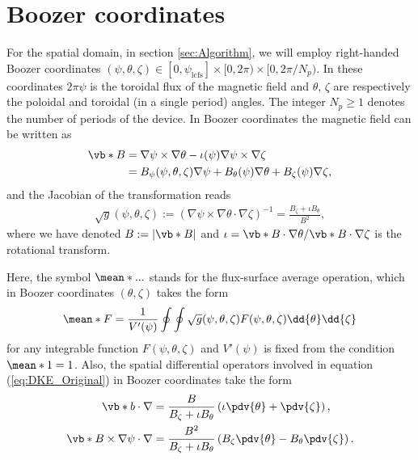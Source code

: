 \section{Boozer coordinates} \label{sec:Appendix_Boozer}
For the spatial domain, in section \ref{sec:Algorithm}, we will employ right-handed Boozer coordinates $(\psi,\theta,\zeta)\in[0,\psi_{\text{lcfs}}]\times[0,2\pi)\times[0,2\pi/N_p)$. In these coordinates $2\pi \psi$ is the toroidal flux of the magnetic field and $\theta$, $\zeta$ are respectively the poloidal and toroidal (in a single period) angles. The integer $N_p\ge 1$ denotes the number of periods of the device. In Boozer coordinates the magnetic field can be written as
\begin{align}
	\vb*{B} & = \nabla\psi \times \nabla\theta - \iota(\psi) \nabla\psi \times \nabla\zeta 
	\nonumber\\
	& = B_\psi(\psi,\theta,\zeta) \nabla \psi + B_\theta(\psi) \nabla \theta + B_\zeta(\psi) \nabla \zeta,
\end{align}
and the Jacobian of the transformation reads 
%
\begin{align}
	\sqrt{g}(\psi,\theta,\zeta) 
	:=( 
	\nabla\psi \times \nabla \theta \cdot \nabla\zeta  
	)^{-1} 
	= 
	\frac{B_\zeta + \iota B_\theta}{B^2},
\end{align}
where we have denoted $B:=|\vb*{B}|$ and $\iota =\vb*{B} \cdot \nabla \theta / \vb*{B} \cdot \nabla \zeta $ is the rotational transform.


Here, the symbol $\mean*{...}$ stands for the flux-surface average operation, which in Boozer coordinates $(\theta,\zeta)$ takes the form
%
\begin{align}
	\mean*{F} = \frac{1}{V'(\psi)}\oint \oint \sqrt{g}(\psi,\theta,\zeta) F(\psi,\theta,\zeta) \dd{\theta}\dd{\zeta}
\end{align}
for any integrable function $F(\psi,\theta,\zeta)$ and $V'(\psi)$ is fixed from the condition $\mean*{1}=1$. Also, the spatial differential operators involved in equation (\ref{eq:DKE_Original}) in Boozer coordinates take the form
%
\begin{align}
	\vb*{b} \cdot \nabla & = 
	\frac{B}{B_\zeta + \iota B_\theta}
	\left(
	\iota \pdv{\theta}
	+ 
	\pdv{\zeta} 
	\right), %
	\\
	\vb*{B}\times\nabla\psi \cdot \nabla & = 
	\frac{B^2}{B_\zeta + \iota B_\theta}
	\left(
	B_\zeta \pdv{\theta}
	-
	B_\theta \pdv{\zeta}
	\right). %
\end{align}





